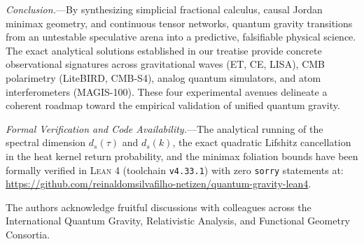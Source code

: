 \documentclass[aps,prl,reprint,twocolumn,superscriptaddress,nofootinbib,floatfix]{revtex4-2}
\begin{document}
\emph{Conclusion.}---By synthesizing simplicial fractional calculus, causal Jordan minimax geometry, and continuous tensor networks, quantum gravity transitions from an untestable speculative arena into a predictive, falsifiable physical science. The exact analytical solutions established in our treatise provide concrete observational signatures across gravitational waves (ET, CE, LISA), CMB polarimetry (LiteBIRD, CMB-S4), analog quantum simulators, and atom interferometers (MAGIS-100). These four experimental avenues delineate a coherent roadmap toward the empirical validation of unified quantum gravity.

\emph{Formal Verification and Code Availability.}---The analytical running of the spectral dimension $d_s(\tau)$ and $d_s(k)$, the exact quadratic Lifshitz cancellation in the heat kernel return probability, and the minimax foliation bounds have been formally verified in \textsc{Lean 4} (toolchain \texttt{v4.33.1}) with zero \texttt{sorry} statements at: \url{https://github.com/reinaldomsilvafilho-netizen/quantum-gravity-lean4}.

\begin{acknowledgments}
The authors acknowledge fruitful discussions with colleagues across the International Quantum Gravity, Relativistic Analysis, and Functional Geometry Consortia.
\end{acknowledgments}
\end{document}
